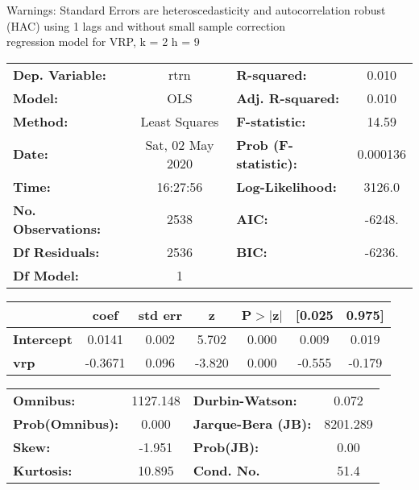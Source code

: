 Warnings: \newline
 [1] Standard Errors are heteroscedasticity and autocorrelation robust (HAC) using 1 lags and without small sample correction\\ 

regression model for VRP, k = 2 h = 9\begin{center}
\begin{tabular}{lclc}
\toprule
\textbf{Dep. Variable:}    &       rtrn       & \textbf{  R-squared:         } &     0.010   \\
\textbf{Model:}            &       OLS        & \textbf{  Adj. R-squared:    } &     0.010   \\
\textbf{Method:}           &  Least Squares   & \textbf{  F-statistic:       } &     14.59   \\
\textbf{Date:}             & Sat, 02 May 2020 & \textbf{  Prob (F-statistic):} &  0.000136   \\
\textbf{Time:}             &     16:27:56     & \textbf{  Log-Likelihood:    } &    3126.0   \\
\textbf{No. Observations:} &        2538      & \textbf{  AIC:               } &    -6248.   \\
\textbf{Df Residuals:}     &        2536      & \textbf{  BIC:               } &    -6236.   \\
\textbf{Df Model:}         &           1      & \textbf{                     } &             \\
\bottomrule
\end{tabular}
\begin{tabular}{lcccccc}
                   & \textbf{coef} & \textbf{std err} & \textbf{z} & \textbf{P$> |$z$|$} & \textbf{[0.025} & \textbf{0.975]}  \\
\midrule
\textbf{Intercept} &       0.0141  &        0.002     &     5.702  &         0.000        &        0.009    &        0.019     \\
\textbf{vrp}       &      -0.3671  &        0.096     &    -3.820  &         0.000        &       -0.555    &       -0.179     \\
\bottomrule
\end{tabular}
\begin{tabular}{lclc}
\textbf{Omnibus:}       & 1127.148 & \textbf{  Durbin-Watson:     } &    0.072  \\
\textbf{Prob(Omnibus):} &   0.000  & \textbf{  Jarque-Bera (JB):  } & 8201.289  \\
\textbf{Skew:}          &  -1.951  & \textbf{  Prob(JB):          } &     0.00  \\
\textbf{Kurtosis:}      &  10.895  & \textbf{  Cond. No.          } &     51.4  \\
\bottomrule
\end{tabular}
\end{center}

